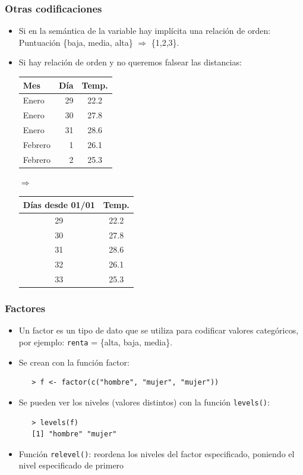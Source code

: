 \documentclass{beamer}
\begin{document}
\begin{frame}
\frametitle{Otras codificaciones}
\begin{itemize}\setlength{\itemsep}{\fill}
\item Si en la semántica de la variable hay implícita una relación de orden: Puntuación \{baja, media, alta\} $\Rightarrow$ \{1,2,3\}.

\item Si hay relación de orden y no queremos falsear las distancias:\\
\vspace{1em}

\begin{tabular}{lrc}
\toprule
Mes & Día & Temp. \\
\midrule
Enero & 29 & 22.2 \\
Enero & 30 & 27.8 \\
Enero & 31 & 28.6 \\
Febrero &  1 & 26.1 \\
Febrero &  2 & 25.3 \\
\bottomrule
\end{tabular}
%
\hfill $\boldsymbol{\Longrightarrow}$ \hfill
%
\begin{tabular}{cc}
\toprule
Días desde 01/01 & Temp. \\
\midrule
29 & 22.2 \\
30 & 27.8 \\
31 & 28.6 \\
32 & 26.1 \\
33 & 25.3 \\
\bottomrule
\end{tabular}
\end{itemize}
\end{frame}


\begin{frame}[fragile]
\frametitle{Factores}
\begin{itemize}
\item Un factor es un tipo de dato que se utiliza para codificar valores categóricos, por ejemplo: \texttt{renta} = \{alta, baja, media\}.
\item Se crean con la función factor:
\begin{verbatim}
   > f <- factor(c("hombre", "mujer", "mujer"))
\end{verbatim}
\item Se pueden ver los niveles (valores distintos) con la función \texttt{levels()}:
\begin{verbatim}
   > levels(f)
   [1] "hombre" "mujer"
\end{verbatim}
\item Función \texttt{relevel()}: reordena los niveles del factor especificado, poniendo el nivel especificado de primero
\end{itemize}
\end{frame}
\end{document}
